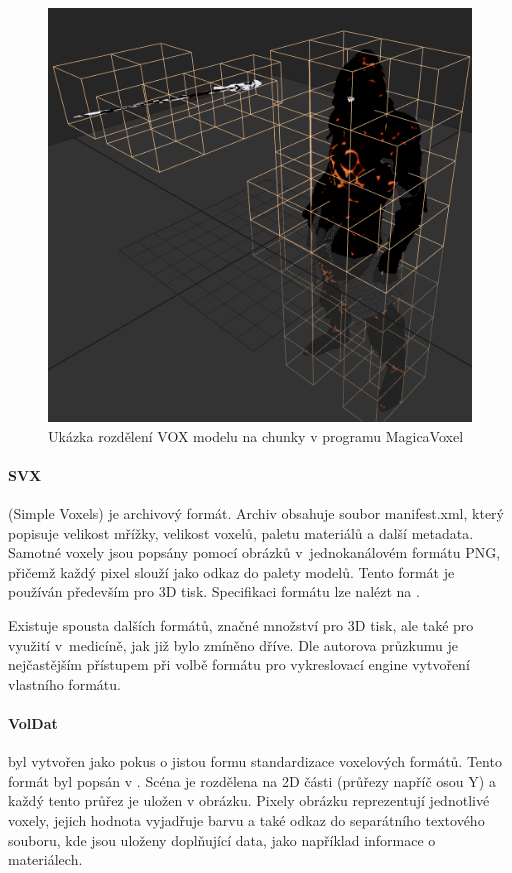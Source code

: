 \begin{figure}[H]
	\centering
	\includegraphics[scale=0.5]{images/magica_voxel_vox.png}
	\caption{Ukázka rozdělení VOX modelu na chunky v programu MagicaVoxel}
	\label{fig:magica_vox}
\end{figure}

\paragraph{SVX} (Simple Voxels) je archivový formát. Archiv obsahuje soubor manifest.xml, který popisuje velikost mřížky, velikost voxelů, paletu materiálů a další metadata. Samotné voxely jsou popsány pomocí obrázků v~jednokanálovém formátu PNG, přičemž každý pixel slouží jako odkaz do palety modelů. Tento formát je používán především pro 3D tisk. Specifikaci formátu lze nalézt na \cite{svx_format_2014}.

Existuje spousta dalších formátů, značné množství pro 3D tisk, ale také pro využití v~medicíně, jak již bylo zmíněno dříve. Dle autorova průzkumu je nejčastějším přístupem při volbě formátu pro vykreslovací engine vytvoření vlastního formátu.

\paragraph{VolDat} byl vytvořen jako pokus o jistou formu standardizace voxelových formátů. Tento formát byl popsán v \cite{williams_2013}. Scéna je rozdělena na 2D části (průřezy napříč osou Y) a každý tento průřez je uložen v obrázku. Pixely obrázku reprezentují jednotlivé voxely, jejich hodnota vyjadřuje barvu a také odkaz do separátního textového souboru, kde jsou uloženy doplňující data, jako například informace o materiálech. 


